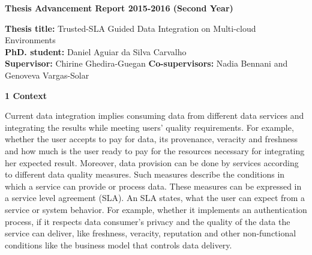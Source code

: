 \documentclass[11pt,a4paper,oneside]{report}
\author{Daniel Aguiar da Silva Carvalho}
\begin{document}
\sffamily
\begin{center}
\textbf{\large{Thesis Advancement Report 2015-2016 (Second Year)}}
\end{center}

\begin{flushleft}
\textbf{Thesis title:} Trusted-SLA Guided Data Integration on Multi-cloud Environments \\
\textbf{PhD. student:} Daniel Aguiar da Silva Carvalho \\
\textbf{Supervisor:} Chirine Ghedira-Guegan \textbf{Co-supervisors:} Nadia Bennani and Genoveva Vargas-Solar 
\end{flushleft}

\begin{flushleft}
\textbf{1 Context} \\
\end{flushleft} 


Current data integration implies consuming data from different data services and integrating the results while meeting users' quality requirements. %
For example, whether the user accepts to pay for data, its provenance, veracity and freshness and how much is the user ready to pay for the resources necessary for integrating her expected result. 
Moreover, data provision can be done by services according to different data quality measures. Such measures describe the conditions in which a service can provide or process data. These measures can be expressed in a service level agreement (SLA). An SLA states, what the user can expect from a service or system behavior. For example, whether it implements an authentication process, if it respects data consumer's privacy and the quality of the data the service can deliver, like freshness, veracity, reputation and other non-functional conditions like the business model that controls data delivery.
\end{document}
